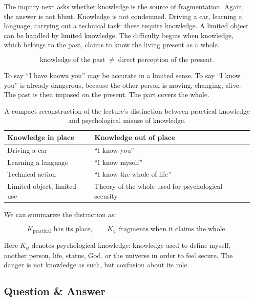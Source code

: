 The inquiry next asks whether knowledge is the source of fragmentation. Again, the answer is not blunt. Knowledge is not condemned. Driving a car, learning a language, carrying out a technical task: these require knowledge. A limited object can be handled by limited knowledge. The difficulty begins when knowledge, which belongs to the past, claims to know the living present as a whole.

\begin{equation}
\text{knowledge of the past}
\;\not=\;
\text{direct perception of the present}.
\end{equation}

To say ``I have known you'' may be accurate in a limited sense. To say ``I know you'' is already dangerous, because the other person is moving, changing, alive. The past is then imposed on the present. The part covers the whole.

\begin{table}
\centering
\begin{tabular}{p{.42\linewidth} p{.42\linewidth}}
\hline
Knowledge in place & Knowledge out of place \\
\hline
Driving a car & ``I know you'' \\
Learning a language & ``I know myself'' \\
Technical action & ``I know the whole of life'' \\
Limited object, limited use & Theory of the whole used for psychological security \\
\hline
\end{tabular}
\caption{A compact reconstruction of the lecture's distinction between practical knowledge and psychological misuse of knowledge.}
\end{table}

We can summarize the distinction as:

\begin{equation}
K_{\mathrm{practical}} \text{ has its place},
\qquad
K_{\psi} \text{ fragments when it claims the whole}.
\end{equation}

Here \(K_{\psi}\) denotes psychological knowledge: knowledge used to define myself, another person, life, status, God, or the universe in order to feel secure. The danger is not knowledge as such, but confusion about its role.

\subsection{Question \& Answer}

